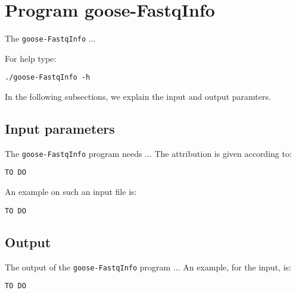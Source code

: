 \section{Program goose-FastqInfo}
The \texttt{goose-FastqInfo} ...

For help type:
\begin{lstlisting}
./goose-FastqInfo -h
\end{lstlisting}
In the following subsections, we explain the input and output paramters.

\subsection{Input parameters}

The \texttt{goose-FastqInfo} program needs ...
The attribution is given according to:
\begin{lstlisting}
TO DO
\end{lstlisting}

An example on such an input file is:
\begin{lstlisting}
TO DO
\end{lstlisting}

\subsection{Output}
The output of the \texttt{goose-FastqInfo} program ...
An example, for the input, is:
\begin{lstlisting}
TO DO
\end{lstlisting}
